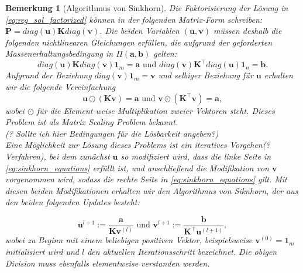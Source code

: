\documentclass[11pt,a4paper]{article}
\newtheorem{remark}[theorem]{Bemerkung}
\numberwithin{equation}{section}
\begin{document}
	
	\begin{remark}[Algorithmus von Sinkhorn]
		Die Faktorisierung der Lösung in \autoref{eq:reg_sol_factorized} können in der folgenden Matrix-Form schreiben: $\boldsymbol{P} = diag(\boldsymbol{u}) \boldsymbol{K} diag(\boldsymbol{v})$. Die beiden Variablen $(\boldsymbol{u}, \boldsymbol{v})$ müssen deshalb die folgenden nichtlinearen Gleichungen erfüllen, die aufgrund der geforderten Massenerhaltungsbedingung in $\Pi (\boldsymbol{a},\boldsymbol{b})$ gelten:
		\begin{equation}
		diag(\boldsymbol{u}) \boldsymbol{K} diag(\boldsymbol{v})\boldsymbol{1}_m = \boldsymbol{a} \text{ und }
		diag(\boldsymbol{v}) \boldsymbol{K}^\top diag(\boldsymbol{u})\boldsymbol{1}_n = \boldsymbol{b}.
		\end{equation}
		Aufgrund der Beziehung $diag(\boldsymbol{v})\boldsymbol{1}_m =  \boldsymbol{v}$ und selbiger Beziehung für $\boldsymbol{u}$ erhalten wir die folgende Vereinfachung
		\begin{equation}
		\boldsymbol{u} \odot (\boldsymbol{K}\boldsymbol{v}) = \boldsymbol{a} \text{ und }
		\boldsymbol{v} \odot (\boldsymbol{K}^\top \boldsymbol{v}) = \boldsymbol{a}, \label{eq:sinkhorn_equations}
		\end{equation}  
		wobei $\odot$ für die Element-weise Multiplikation zweier Vektoren steht. Dieses Problem ist als \textit{Matrix Scaling Problem} \cite{matrix_scaling} bekannt.\\
		(? Sollte ich hier Bedingungen für die Lösbarkeit angeben?) \\
		Eine Möglichkeit zur Lösung dieses Problems ist ein iteratives Vorgehen(?Verfahren), bei dem zunächst $\boldsymbol{u}$ so modifiziert wird, dass die linke Seite in \autoref{eq:sinkhorn_equations} erfüllt ist, und anschließend die Modifikation von $\boldsymbol{v}$ vorgenommen wird, sodass die rechte Seite in \autoref{eq:sinkhorn_equations} gilt. Mit diesen beiden Modifikationen erhalten wir den Algorithmus von Siknhorn, der aus den beiden folgenden Updates besteht:
		
		\begin{equation}
		\boldsymbol{u}^{l+1}:= \frac{\boldsymbol{a}}{\boldsymbol{K}\boldsymbol{v}^{(l)}} \text{ und }
		\boldsymbol{v}^{l+1}:= \frac{\boldsymbol{b}}{\boldsymbol{K}^\top \boldsymbol{u}^{(l+1)}},
		\end{equation} 
		wobei zu Beginn mit einem beliebigen positiven Vektor, beispielsweise $\boldsymbol{v}^{(0)} = \boldsymbol{1}_m$ initialisiert wird und $l$ den aktuellen Iterationsschritt bezeichnet. Die obigen Division muss ebenfalls elementweise verstanden werden.
	\end{remark}
\end{document}
